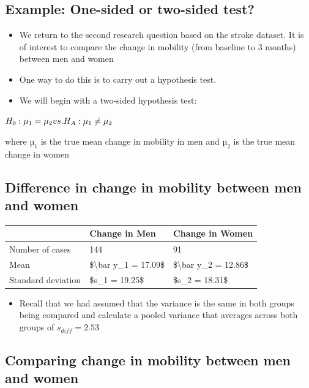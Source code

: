 \documentclass[
]{book}
\providecommand{\tightlist}{%
  \setlength{\itemsep}{0pt}\setlength{\parskip}{0pt}}
\begin{document}
\hypertarget{example-one-sided-or-two-sided-test}{%
\subsection{Example: One-sided or two-sided test?}\label{example-one-sided-or-two-sided-test}}

\begin{itemize}
\tightlist
\item
  We return to the second research question based on the stroke dataset. It is of interest to compare the change in mobility (from baseline to 3 months) between men and women
\item
  One way to do this is to carry out a hypothesis test.
\item
  We will begin with a two-sided hypothesis test:
\end{itemize}

\(H_0: \mu_1=\mu_2\space\space\space\space\space vs. \space\space\space\space\space H_A:\mu_1\neq\mu_2\)

where \(µ_1\) is the true mean change in mobility in men and \(µ_2\) is the true mean change in women

\hypertarget{difference-in-change-in-mobility-between-men-and-women}{%
\subsection{Difference in change in mobility between men and women}\label{difference-in-change-in-mobility-between-men-and-women}}

\begin{tabular}{l|l|l}
\hline
  & Change in Men & Change in Women\\
\hline
Number of cases & 144 & 91\\
\hline
Mean & \$\textbackslash{}bar y\_1 = 17.09\$ & \$\textbackslash{}bar y\_2 = 12.86\$\\
\hline
Standard deviation & \$s\_1 = 19.25\$ & \$s\_2 = 18.31\$\\
\hline
\end{tabular}

\begin{itemize}
\tightlist
\item
  Recall that we had assumed that the variance is the same in both groups being compared and calculate a pooled variance that averages across both groups of \(s_{diff}=2.53\)
\end{itemize}

\hypertarget{comparing-change-in-mobility-between-men-and-women}{%
\subsection{Comparing change in mobility between men and women}\label{comparing-change-in-mobility-between-men-and-women}}
\end{document}
